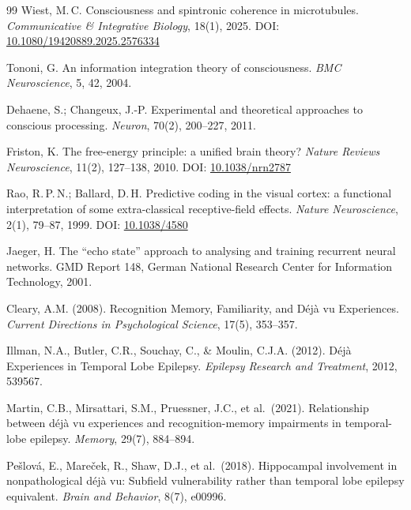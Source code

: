 \documentclass[11pt,a4paper]{article}
\begin{document}
\begin{thebibliography}{99}
Wiest, M.\,C.
\newblock Consciousness and spintronic coherence in microtubules.
\newblock \emph{Communicative \& Integrative Biology}, 18(1), 2025.
\newblock DOI: \href{https://doi.org/10.1080/19420889.2025.2576334}{10.1080/19420889.2025.2576334}

Tononi, G.
\newblock An information integration theory of consciousness.
\newblock \emph{BMC Neuroscience}, 5, 42, 2004.

Dehaene, S.; Changeux, J.-P.
\newblock Experimental and theoretical approaches to conscious processing.
\newblock \emph{Neuron}, 70(2), 200--227, 2011.

Friston, K.
\newblock The free-energy principle: a unified brain theory?
\newblock \emph{Nature Reviews Neuroscience}, 11(2), 127--138, 2010.
\newblock DOI: \href{https://doi.org/10.1038/nrn2787}{10.1038/nrn2787}

Rao, R.\,P.\,N.; Ballard, D.\,H.
\newblock Predictive coding in the visual cortex: a functional interpretation
  of some extra-classical receptive-field effects.
\newblock \emph{Nature Neuroscience}, 2(1), 79--87, 1999.
\newblock DOI: \href{https://doi.org/10.1038/4580}{10.1038/4580}

Jaeger, H.
\newblock The ``echo state'' approach to analysing and training recurrent
  neural networks.
\newblock GMD Report 148, German National Research Center for Information
  Technology, 2001.

Cleary, A.M. (2008).
Recognition Memory, Familiarity, and Déjà vu Experiences.
\textit{Current Directions in Psychological Science}, 17(5), 353--357.

Illman, N.A., Butler, C.R., Souchay, C., \& Moulin, C.J.A. (2012).
Déjà Experiences in Temporal Lobe Epilepsy.
\textit{Epilepsy Research and Treatment}, 2012, 539567.

Martin, C.B., Mirsattari, S.M., Pruessner, J.C., et al.\ (2021).
Relationship between déjà vu experiences and recognition-memory impairments
in temporal-lobe epilepsy.
\textit{Memory}, 29(7), 884--894.

Pe\v{s}lov\'{a}, E., Mare\v{c}ek, R., Shaw, D.J., et al.\ (2018).
Hippocampal involvement in nonpathological déjà vu:
Subfield vulnerability rather than temporal lobe epilepsy equivalent.
\textit{Brain and Behavior}, 8(7), e00996.

\end{thebibliography}
\end{document}
